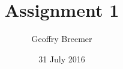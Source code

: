 \newcommand{\usqcoursecode}{MAT8190}
\newcommand{\usqcoursedescription}{Numerical Computation}
\title{Assignment 1}
\author{Geoffry Breemer}
\newcommand{\usqstudentnumber}{0061082147}
\newcommand{\usqstudentemail}{u1082147@umail.usq.edu.au}
\newcommand{\usqacademicyear}{2016}
\newcommand{\usqacademicsemester}{2}
\date{31 July 2016}